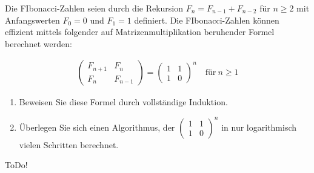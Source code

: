 
\begin{exercise}

Die FIbonacci-Zahlen seien durch die Rekursion $F_n = F_{n-1} + F_{n-2}$ für $n \geq 2$ mit
Anfangswerten $F_0 = 0$ und $F_1 = 1$ definiert. Die FIbonacci-Zahlen können effizient mittels folgender
auf Matrizenmultiplikation beruhender Formel berechnet werden:

\begin{align*}
  \begin{pmatrix}
    F_{n+1} & F_n \\
    F_n & F_{n-1}
  \end{pmatrix}
  =
  \begin{pmatrix}
    1 & 1 \\
    1 & 0
  \end{pmatrix}^n
  \quad \text{für}~ n \geq 1
\end{align*}

\begin{enumerate}[label = (\alph*)]
  \item Beweisen Sie diese Formel durch vollständige Induktion.
  \item Überlegen Sie sich einen Algorithmus, der
  $\begin{pmatrix}
  1 & 1 \\
  1 & 0
  \end{pmatrix}^n$
  in nur logarithmisch vielen Schritten berechnet.
\end{enumerate}
\end{exercise}


\begin{solution}

ToDo!

\end{solution}

